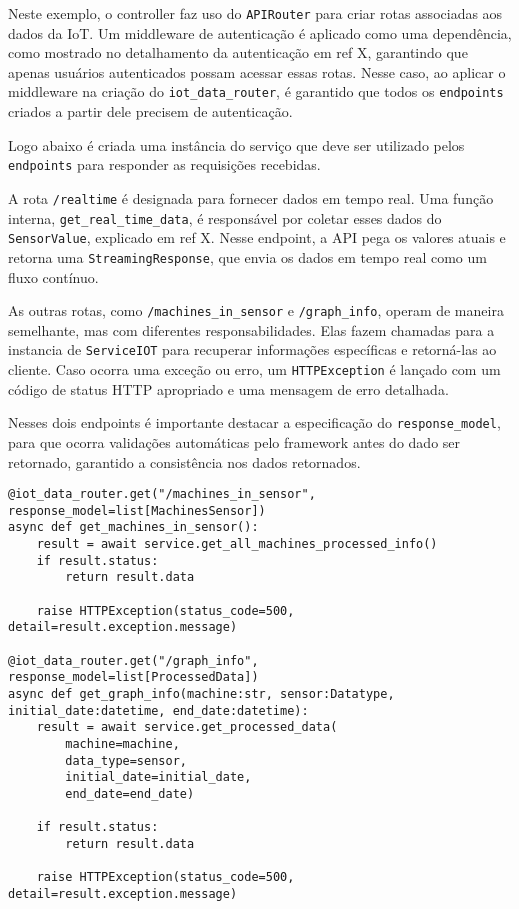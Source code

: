 Neste exemplo, o controller faz uso do \texttt{APIRouter} para criar rotas associadas aos dados da IoT. Um middleware de autenticação é aplicado como uma dependência, como mostrado no detalhamento da autenticação em ref X, garantindo que apenas usuários autenticados possam acessar essas rotas. Nesse caso, ao aplicar o middleware na criação do \texttt{iot\_data\_router}, é garantido que todos os \texttt{endpoints} criados a partir dele precisem de autenticação.

Logo abaixo é criada uma instância do serviço que deve ser utilizado pelos \texttt{endpoints} para responder as requisições recebidas.

A rota \texttt{/realtime} é designada para fornecer dados em tempo real. Uma função interna, \texttt{get\_real\_time\_data}, é 
responsável por coletar esses dados do \texttt{SensorValue}, explicado em ref X. Nesse endpoint, a \gls{API} pega os valores atuais e retorna uma \texttt{StreamingResponse}, que envia os dados em tempo real como um fluxo contínuo.

As outras rotas, como \texttt{/machines\_in\_sensor} e \texttt{/graph\_info}, operam de maneira semelhante, mas com diferentes responsabilidades. Elas fazem chamadas para a instancia de \texttt{ServiceIOT} para recuperar informações específicas e retorná-las ao cliente. Caso ocorra uma exceção ou erro, um \texttt{HTTPException} é lançado com um código de status HTTP apropriado e uma mensagem de erro detalhada.

Nesses dois endpoints é importante destacar a especificação do \texttt{response\_model}, para que ocorra validações automáticas pelo framework antes do dado ser retornado, garantido a consistência nos dados retornados.

\begin{verbatim}
@iot_data_router.get("/machines_in_sensor", response_model=list[MachinesSensor])
async def get_machines_in_sensor():
    result = await service.get_all_machines_processed_info()
    if result.status:
        return result.data
    
    raise HTTPException(status_code=500, detail=result.exception.message)

@iot_data_router.get("/graph_info", response_model=list[ProcessedData])
async def get_graph_info(machine:str, sensor:Datatype, initial_date:datetime, end_date:datetime):
    result = await service.get_processed_data(
        machine=machine,
        data_type=sensor,
        initial_date=initial_date,
        end_date=end_date)
    
    if result.status:
        return result.data
    
    raise HTTPException(status_code=500, detail=result.exception.message)
\end{verbatim}

